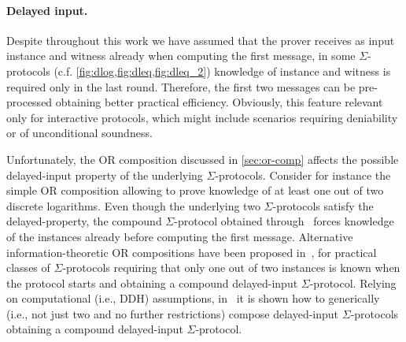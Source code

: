 \documentclass[runningheads]{llncs}
\begin{document}
\paragraph{Delayed input.}
Despite throughout this work we have assumed that the prover receives as input
instance and witness already when computing the first message, in some $\Sigma$-protocols (c.f. \cref{fig:dlog,fig:dleq,fig:dleq_2})  knowledge of instance and witness is required only in the last round. Therefore,
 the first two messages can be pre-processed obtaining better practical efficiency.
 Obviously, this feature relevant only for interactive protocols, which
 might include scenarios requiring deniability or of unconditional soundness.

Unfortunately, the OR composition discussed in \cref{sec:or-comp} affects the possible
delayed-input property of the underlying $\Sigma$-protocols. Consider for instance
the simple OR composition allowing to prove knowledge of at least one out of
two discrete logarithms. Even though the underlying two $\Sigma$-protocols
satisfy the delayed-property, the compound $\Sigma$-protocol obtained through~\cite{C:CraDamSch94}
forces knowledge of the instances already before computing the first message.
Alternative information-theoretic OR compositions have been proposed in~\cite{TCC:CPSSV16},
for practical classes of $\Sigma$-protocols requiring that only one out of two
instances is known when the protocol starts and obtaining a compound delayed-input
$\Sigma$-protocol. Relying on computational (i.e., DDH) assumptions, in~\cite{EC:CPSSV16} it is shown how to generically (i.e., not just two and no further restrictions) compose delayed-input $\Sigma$-protocols obtaining a compound delayed-input $\Sigma$-protocol.
\end{document}

